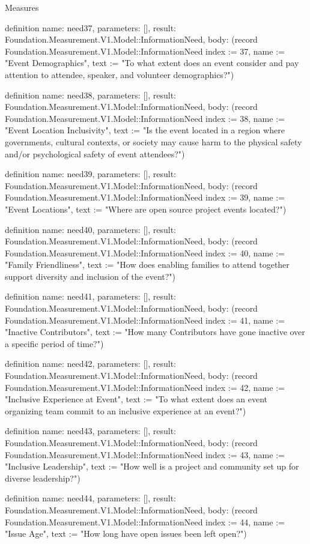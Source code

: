 \begin{lexlean}{Measures}
\begin{semanticmodule}
definition{
  name: need37,
  parameters: [],
  result: Foundation.Measurement.V1.Model::InformationNeed,
  body: (record Foundation.Measurement.V1.Model::InformationNeed {index := 37, name := "Event Demographics", text := "To what extent does an event consider and pay attention to attendee, speaker, and volunteer demographics?"})
}

definition{
  name: need38,
  parameters: [],
  result: Foundation.Measurement.V1.Model::InformationNeed,
  body: (record Foundation.Measurement.V1.Model::InformationNeed {index := 38, name := "Event Location Inclusivity", text := "Is the event located in a region where governments, cultural contexts, or society may cause harm to the physical safety and/or psychological safety of event attendees?"})
}

definition{
  name: need39,
  parameters: [],
  result: Foundation.Measurement.V1.Model::InformationNeed,
  body: (record Foundation.Measurement.V1.Model::InformationNeed {index := 39, name := "Event Locations", text := "Where are open source project events located?"})
}

definition{
  name: need40,
  parameters: [],
  result: Foundation.Measurement.V1.Model::InformationNeed,
  body: (record Foundation.Measurement.V1.Model::InformationNeed {index := 40, name := "Family Friendliness", text := "How does enabling families to attend together support diversity and inclusion of the event?"})
}

definition{
  name: need41,
  parameters: [],
  result: Foundation.Measurement.V1.Model::InformationNeed,
  body: (record Foundation.Measurement.V1.Model::InformationNeed {index := 41, name := "Inactive Contributors", text := "How many Contributors have gone inactive over a specific period of time?"})
}

definition{
  name: need42,
  parameters: [],
  result: Foundation.Measurement.V1.Model::InformationNeed,
  body: (record Foundation.Measurement.V1.Model::InformationNeed {index := 42, name := "Inclusive Experience at Event", text := "To what extent does an event organizing team commit to an inclusive experience at an event?"})
}

definition{
  name: need43,
  parameters: [],
  result: Foundation.Measurement.V1.Model::InformationNeed,
  body: (record Foundation.Measurement.V1.Model::InformationNeed {index := 43, name := "Inclusive Leadership", text := "How well is a project and community set up for diverse leadership?"})
}

definition{
  name: need44,
  parameters: [],
  result: Foundation.Measurement.V1.Model::InformationNeed,
  body: (record Foundation.Measurement.V1.Model::InformationNeed {index := 44, name := "Issue Age", text := "How long have open issues been left open?"})
}


\end{semanticmodule}
\end{lexlean}
